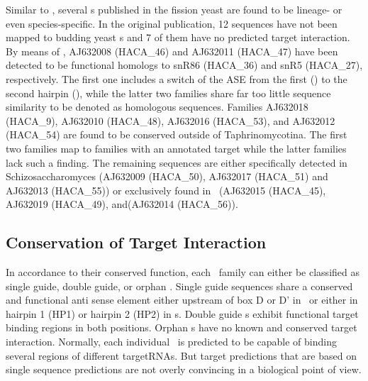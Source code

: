 Similar to \calb, several \sno s published in the fission yeast
\cite{Li:2005} are found to be lineage- or even species-specific. In
the original publication, 12 sequences have not been mapped to budding
yeast \sno s and 7 of them have no predicted target interaction. By
means of \snostrip, AJ632008 (HACA\_46) and AJ632011
(HACA\_47) have been detected to be functional homologs to snR86
(HACA\_36) and snR5 (HACA\_27), respectively. The first one includes a
switch of the ASE from the first (\spo) to the second hairpin (\sce), while the
latter two families share far too little sequence similarity to be
denoted as homologous sequences. Families AJ632018 (HACA\_9), AJ632010
(HACA\_48), AJ632016 (HACA\_53), and AJ632012 (HACA\_54) are found to
be conserved outside of Taphrinomycotina. The first two families map
to families with an annotated target while the latter families lack
such a finding. The remaining sequences are either specifically
detected in Schizosaccharomyces (AJ632009 (HACA\_50), AJ632017
(HACA\_51) and AJ632013 (HACA\_55)) or exclusively found in \spo\
(AJ632015 (HACA\_45), AJ632019 (HACA\_49), and(AJ632014 (HACA\_56)).

\subsection{Conservation of Target Interaction}


In accordance to their conserved function, each \sno\ family can
either be classified as single guide, double guide, or orphan
\sno. Single guide sequences share a conserved and functional anti
sense element either upstream of box D or D' in \cd\ or either in
hairpin 1 (HP1) or hairpin 2 (HP2) in \haca s. Double guide \sno s
exhibit functional target binding regions in both positions. Orphan
\sno s have no known and conserved target interaction. Normally, each
individual \sno\ is predicted to be capable of binding several regions
of different targetRNAs. But target predictions that are based on
single sequence predictions are not overly convincing in a biological
point of view.

